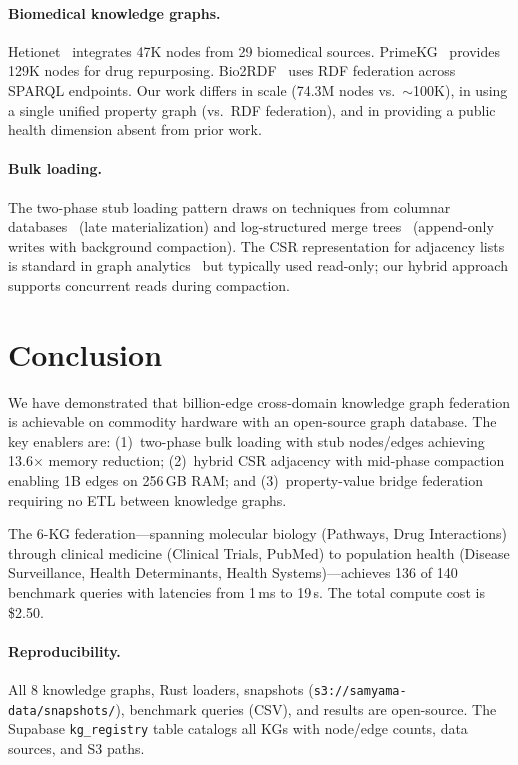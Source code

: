 \documentclass[11pt]{article}
\begin{document}
\paragraph{Biomedical knowledge graphs.} Hetionet~\citep{himmelstein2017hetionet} integrates 47K nodes from 29 biomedical sources. PrimeKG~\citep{chandak2023primekg} provides 129K nodes for drug repurposing. Bio2RDF~\citep{belleau2008bio2rdf} uses RDF federation across SPARQL endpoints. Our work differs in scale (74.3M nodes vs.\ ${\sim}$100K), in using a single unified property graph (vs.\ RDF federation), and in providing a public health dimension absent from prior work.

\paragraph{Bulk loading.} The two-phase stub loading pattern draws on techniques from columnar databases~\citep{abadi2008column} (late materialization) and log-structured merge trees~\citep{oneil1996lsm} (append-only writes with background compaction). The CSR representation for adjacency lists is standard in graph analytics~\citep{iosup2016ldbc} but typically used read-only; our hybrid approach supports concurrent reads during compaction.

\section{Conclusion}

We have demonstrated that billion-edge cross-domain knowledge graph federation is achievable on commodity hardware with an open-source graph database. The key enablers are: (1)~two-phase bulk loading with stub nodes/edges achieving 13.6$\times$ memory reduction; (2)~hybrid CSR adjacency with mid-phase compaction enabling 1B edges on 256\,GB RAM; and (3)~property-value bridge federation requiring no ETL between knowledge graphs.

The 6-KG federation---spanning molecular biology (Pathways, Drug Interactions) through clinical medicine (Clinical Trials, PubMed) to population health (Disease Surveillance, Health Determinants, Health Systems)---achieves 136 of 140 benchmark queries with latencies from 1\,ms to 19\,s. The total compute cost is \$2.50.

\paragraph{Reproducibility.} All 8 knowledge graphs, Rust loaders, snapshots (\texttt{s3://samyama-data/snapshots/}), benchmark queries (CSV), and results are open-source. The Supabase \texttt{kg\_registry} table catalogs all KGs with node/edge counts, data sources, and S3 paths.
\end{document}
